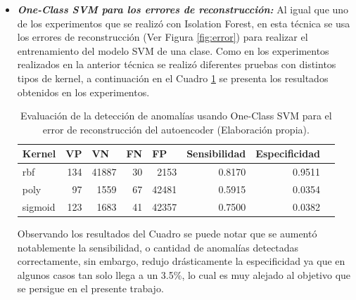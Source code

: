 \begin{itemize}
\item \textbf{\textit{One-Class SVM para los errores de reconstrucci\'{o}n: }}Al igual que uno de los experimentos que se realiz\'{o} con Isolation Forest, en esta t\'{e}cnica se usa los errores de reconstrucci\'{o}n (Ver Figura \ref{fig:error}) para realizar el entrenamiento del modelo SVM de una clase. Como en los experimentos realizados en la anterior t\'{e}cnica se realiz\'{o} diferentes pruebas con distintos tipos de kernel, a continuaci\'{o}n en el Cuadro \ref{table:evaluacion_SVM_error} se presenta los resultados obtenidos en los experimentos.

\begin{table}[H]
\centering
\begin{center}
\begin{tabular}{|l|r|r|r|r|r|r|r|}
\hline
\textbf{Kernel} & \multicolumn{1}{l|}{\textbf{VP}} & \multicolumn{1}{l|}{\textbf{VN}}& \multicolumn{1}{l|}{\textbf{FN}}& \multicolumn{1}{l|}{\textbf{FP}} & \multicolumn{1}{l|}{\textbf{Sensibilidad}} & \multicolumn{1}{l|}{\textbf{Especificidad}} \\ \hline
rbf & \cellcolor[HTML]{AADD99} 134 & \cellcolor[HTML]{AADD99} 41887 & \cellcolor[HTML]{FFCE93} 30 & \cellcolor[HTML]{FFCE93} 2153 & 0.8170 & 0.9511 \\ \hline
poly & \cellcolor[HTML]{AADD99} 97 & \cellcolor[HTML]{AADD99} 1559 & \cellcolor[HTML]{FFCE93} 67 & \cellcolor[HTML]{FFCE93} 42481 & 0.5915 & 0.0354 \\ \hline
sigmoid & \cellcolor[HTML]{AADD99} 123 & \cellcolor[HTML]{AADD99} 1683 & \cellcolor[HTML]{FFCE93} 41 & \cellcolor[HTML]{FFCE93} 42357 & 0.7500 & 0.0382 \\ \hline
\end{tabular}
\end{center}
\caption{Evaluaci\'{o}n de la detecci\'{o}n de anomal\'{i}as usando One-Class SVM para el error de reconstrucci\'{o}n del autoencoder (Elaboraci\'{o}n propia).}

\label{table:evaluacion_SVM_error}
\end{table}


Observando los resultados del Cuadro se puede notar que se aument\'{o} notablemente la sensibilidad, o cantidad de anomal\'{i}as detectadas correctamente, sin embargo, redujo dr\'{a}sticamente la especificidad ya que en algunos casos tan solo llega a un 3.5\%, lo cual es muy alejado al objetivo que se persigue en el presente trabajo.

\end{itemize}

